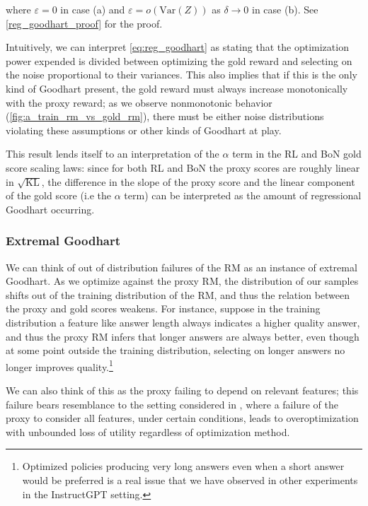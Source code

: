 \documentclass{article}
\theoremstyle{plain}
\newcommand{\skl}{$\sqrt{\text{KL}}$}
\begin{document}
where $\varepsilon=0$ in case (a) and $\varepsilon=o\left(\mathrm{Var}\left(Z\right)\right)$ as $\delta\to 0$ in case (b). See \cref{reg_goodhart_proof} for the proof.

Intuitively, we can interpret \cref{eq:reg_goodhart} as stating that the optimization power expended is divided between optimizing the gold reward and selecting on the noise    proportional to their variances. This also implies that if this is the only kind of Goodhart present, the gold reward must always increase monotonically with the proxy reward; as we observe nonmonotonic behavior (\cref{fig:a_train_rm_vs_gold_rm}), there must be either noise distributions violating these assumptions or other kinds of Goodhart at play.

This result lends itself to an interpretation of the $\alpha$ term in the RL and BoN gold score scaling laws: since for both RL and BoN the proxy scores are roughly linear in \skl, the difference in the slope of the proxy score and the linear component of the gold score (i.e the $\alpha$ term) can be interpreted as the amount of regressional Goodhart occurring. 

\subsubsection{Extremal Goodhart}\label{extremal_goodhart}

We can think of out of distribution failures of the RM as an instance of extremal Goodhart. As we optimize against the proxy RM, the distribution of our samples shifts out of the training distribution of the RM, and thus the relation between the proxy and gold scores weakens. For instance, suppose in the training distribution a feature like answer length always indicates a higher quality answer, and thus the proxy RM infers that longer answers are always better, even though at some point outside the training distribution, selecting on longer answers no longer improves quality.\footnote{Optimized policies producing very long answers even when a short answer would be preferred is a real issue that we have observed in other experiments in the InstructGPT setting.}

We can also think of this as the proxy failing to depend on relevant features; this failure bears resemblance to the setting considered in \citet{zhuang2020consequences}, where a failure of the proxy to consider all features, under certain conditions, leads to overoptimization with unbounded loss of utility regardless of optimization method.
\end{document}
